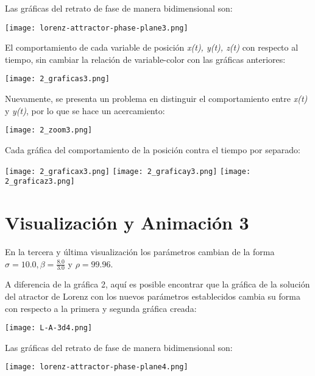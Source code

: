 \documentclass{article}
\begin{document}
Las gráficas del retrato de fase de manera bidimensional son:

	\begin{center}
    \texttt{[image: lorenz-attractor-phase-plane3.png]}
    \end{center}

El comportamiento de cada variable de posición \textit{x(t), y(t), z(t)} con respecto al tiempo, sin cambiar la relación de variable-color con las gráficas anteriores:

	\begin{center}
    \texttt{[image: 2\_graficas3.png]}
    \end{center}

Nuevamente, se presenta un problema en distinguir el comportamiento entre \textit{x(t)} y \textit{y(t)}, por lo que se hace un acercamiento:

    \begin{center}
    \centering
    \texttt{[image: 2\_zoom3.png]}
    \end{center}

Cada gráfica del comportamiento de la posición contra el tiempo por separado:

	\begin{center}
    \centering
    \texttt{[image: 2\_graficax3.png]}
	\texttt{[image: 2\_graficay3.png]}
    \texttt{[image: 2\_graficaz3.png]}
    \end{center}



\section{Visualización y Animación 3}

En la tercera y última visualización los parámetros cambian de la forma $\sigma=10.0, \beta=\frac{8.0}{3.0}$ y $\rho=99.96 $.

A diferencia de la gráfica 2, aquí es posible encontrar que la gráfica de la solución del atractor de Lorenz con los nuevos parámetros establecidos cambia su forma con respecto a la primera y segunda gráfica creada:

	\begin{center}
    \texttt{[image: L-A-3d4.png]}
    \end{center}

Las gráficas del retrato de fase de manera bidimensional son:

	\begin{center}
    \texttt{[image: lorenz-attractor-phase-plane4.png]}
    \end{center}
\end{document}
